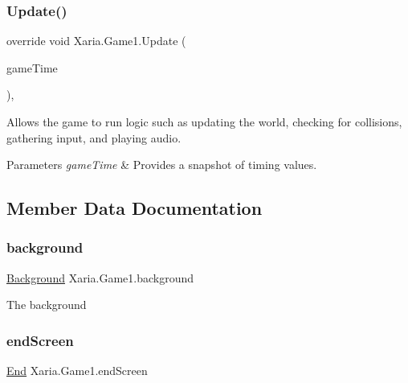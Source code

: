 \subsubsection{\texorpdfstring{Update()}{Update()}}
{\footnotesize\ttfamily override void Xaria.\+Game1.\+Update (\begin{DoxyParamCaption}\item[{Game\+Time}]{game\+Time }\end{DoxyParamCaption})\hspace{0.3cm}{\ttfamily [inline]}, {\ttfamily [protected]}}



Allows the game to run logic such as updating the world, checking for collisions, gathering input, and playing audio. 


\begin{DoxyParams}{Parameters}
{\em game\+Time} & Provides a snapshot of timing values.\\
\hline
\end{DoxyParams}


\subsection{Member Data Documentation}
\mbox{\label{classXaria_1_1Game1_a78d1a6b1749b5d112ca90524a74728ed}} 
\subsubsection{\texorpdfstring{background}{background}}
{\footnotesize\ttfamily \hyperlink{classXaria_1_1Screens_1_1Background}{Background} Xaria.\+Game1.\+background\hspace{0.3cm}{\ttfamily [private]}}



The background 

\mbox{\label{classXaria_1_1Game1_a24d32974a54581bfc6931f9dd8b3b107}} 
\subsubsection{\texorpdfstring{end\+Screen}{endScreen}}
{\footnotesize\ttfamily \hyperlink{classXaria_1_1Screens_1_1End}{End} Xaria.\+Game1.\+end\+Screen\hspace{0.3cm}{\ttfamily [private]}}



